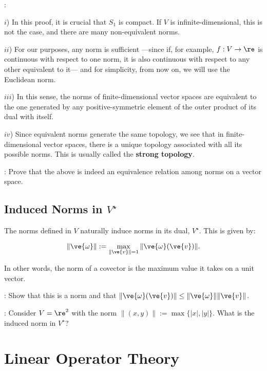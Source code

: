 \noi{}:

\noi $i$) In this proof, it is crucial that $S_1$ is compact. If $V$ is infinite-dimensional, this is not the case, and there are many non-equivalent norms.

\noi $ii$) For our purposes, any norm is sufficient ---since if, for example, $f:V\to \re$ is continuous with respect to one norm, it is also continuous with 
respect to any other equivalent to it--- and for simplicity, from now on, we will use the Euclidean norm.

\noi $iii$) In this sense, the norms of finite-dimensional vector spaces are equivalent to the one 
generated by any positive-symmetric element of the outer product of its dual with itself.

\noi $iv$) Since equivalent norms generate the same topology, we see that in finite-dimensional vector spaces,
 there is a unique topology associated with all its possible norms. 
 This is usually called the {\bf strong topology}.

\ejer: Prove that the above is indeed an equivalence relation among norms on a vector space.


\subsection{Induced Norms in $V^{\star}$}


The norms defined in $V$ naturally induce norms in its dual, $V^{\star}$. 
This is given by: 

\begin{equation} 
  \label{eq:norma_inducida_en_dual} \|\ve{\omega}\| := \max_{\|\ve{v}\|=1}{\|\ve{\omega}(\ve{v})\|}. 
\end{equation} 

In other words, the norm of a covector is the maximum value it takes on a unit vector.
\espa

\ejer: Show that this is a norm and that $\|\ve{\omega}(\ve{v})\| \leq \|\ve{\omega}\|\|\ve{v}\|$.

\ejer: Consider $V=\re^2$ with the norm $\|(x,y)\|:= \max\{|x|,|y|\}$. 
What is the induced norm in $V^{\star}$?



\section{Linear Operator Theory}
\label{Teoria_de_Operadores_Lineales}

